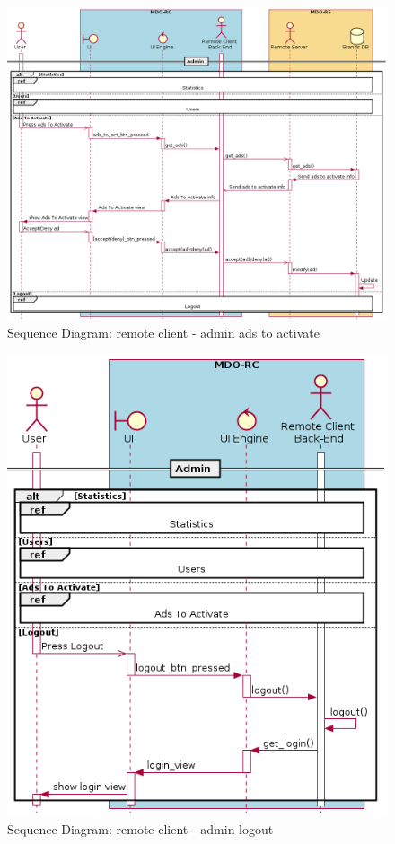 \begin{figure}[htb!]
\centering
    \includegraphics[width=1\columnwidth]{./img/seq-rc-admin-ads-to-act.png}
  \caption{Sequence Diagram: remote client - admin ads to activate}%
\label{fig:seq-rc-admin-ads-to-act}
\end{figure}

\begin{figure}[htb!]
\centering
    \includegraphics[width=0.7\columnwidth]{./img/seq-rc-admin-logout.png}
  \caption{Sequence Diagram: remote client - admin logout}%
\label{fig:seq-rc-admin-logout}
\end{figure}


